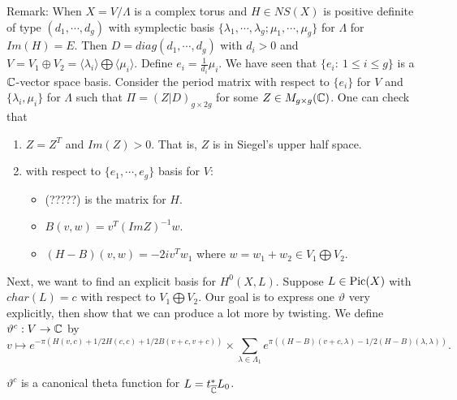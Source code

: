 Remark: When $X=V/\Lambda$ is a complex torus and $H\in NS(X)$ is positive definite of type $(d_1,\cdots,d_g)$ with symplectic basis $\{\lambda_1,\cdots,\lambda_g;\mu_1,\cdots,\mu_g\}$ for $\Lambda$ for $Im(H)=E$. Then $D=diag(d_1,\cdots, d_g)$ with $d_i>0$ and $V=V_1\oplus V_2=\langle \lambda_i\rangle\bigoplus \langle \mu_i\rangle$. Define $e_i=\frac{1}{d_i}\mu_i$. We have seen that $\{e_i:\ 1\leq i \leq g\}$ is a ${\mathbb C}$-vector space basis. Consider the period matrix with respect to $\{e_i\}$ for $V$ and $\{\lambda_i,\mu_i\}$ for $\Lambda$ such that $\Pi = (Z|D)_{g\times 2g}$ for some $Z\in M_{g\times g}({\mathbb C})$. One can check that 
\begin{enumerate}
\item $Z=Z^T$ and $Im(Z)>0$. That is, $Z$ is in Siegel's upper half space. 
\item with respect to $\{e_1,\cdots,e_g\}$ basis for $V$:
\begin{itemize}
\item (?????) is the matrix for $H$.
\item  $B(v,w)=v^T(Im Z)^{-1}w$.
\item $(H-B)(v,w)=-2iv^Tw_1$ where $w=w_1+w_2\in V_1\bigoplus V_2$.
\end{itemize} 
\end{enumerate}

Next, we want to find an explicit basis for $H^0(X,L)$. Suppose $L\in \operatorname{Pic}(X)$ with $char(L)=c$ with respect to $V_1\bigoplus V_2$. Our goal is to express one $\vartheta$ very explicitly, then show that we can produce a lot more by twisting. We define $\vartheta^c:V\to {\mathbb C}$ by 
$$v\mapsto e^{-\pi(H(v,c)+1/2H(c,c)+1/2 B(v+c,v+c))}\times \sum_{\lambda\in \Lambda_1} e^{\pi((H-B)(v+c,\lambda)-1/2(H-B)(\lambda,\lambda))}.$$

\begin{theorem}
$\vartheta^c$ is a canonical theta function for $L=t_{\overline{{\mathbb C}}}^* L_0$. 
\end{theorem}

